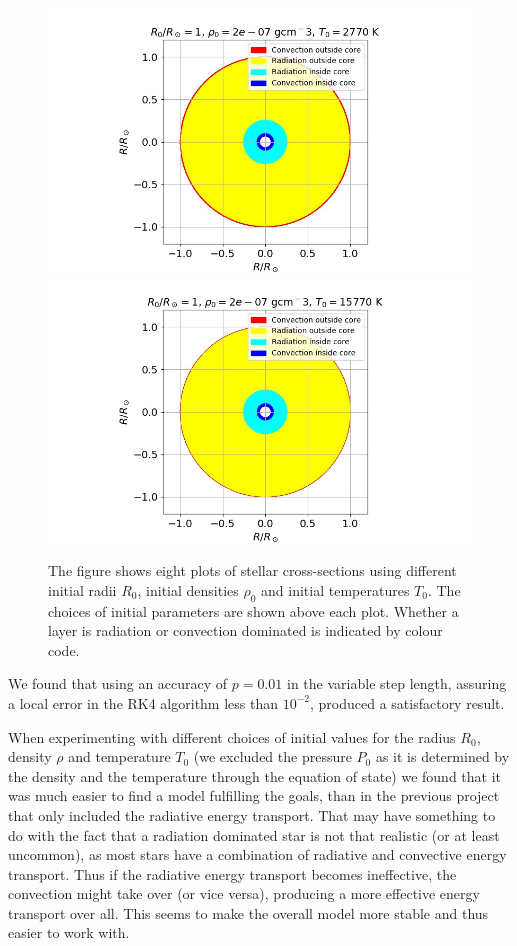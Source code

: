 \documentclass{emulateapj}
\begin{document}
\begin{figure}
		\includegraphics[width=1\columnwidth]{CrossSec7.jpg}
		\includegraphics[width=1\columnwidth]{CrossSec8.jpg}
		\caption{The figure shows eight plots of stellar cross-sections using different initial radii $R_0$, initial densities $\rho_0$ and initial temperatures $T_0$. The choices of initial parameters are shown above each plot. Whether a layer is radiation or convection dominated is indicated by colour code.}
		\label{fig:CrossSec}		
	\end{figure}
	
	We found that using an accuracy of $p = 0.01$ in the variable step length, assuring a local error in the RK4 algorithm less than $10^{-2}$, produced a satisfactory result.
	
	When experimenting with different choices of initial values for the radius $R_0$, density $\rho$ and temperature $T_0$ (we excluded the pressure $P_0$ as it is determined by the density and the temperature through the equation of state) we found that it was much easier to find a model fulfilling the goals, than in the previous project that only included the radiative energy transport. That may have something to do with the fact that a radiation dominated star is not that realistic (or at least uncommon), as most stars have a combination of radiative and convective energy transport. Thus if the radiative energy transport becomes ineffective, the convection might take over (or vice versa), producing a more effective energy transport over all. This seems to make the overall model more stable and thus easier to work with. 
	
\end{document}
